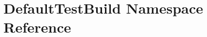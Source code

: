 \hypertarget{namespaceDefaultTestBuild}{\section{Default\-Test\-Build Namespace Reference}
\label{namespaceDefaultTestBuild}
}

